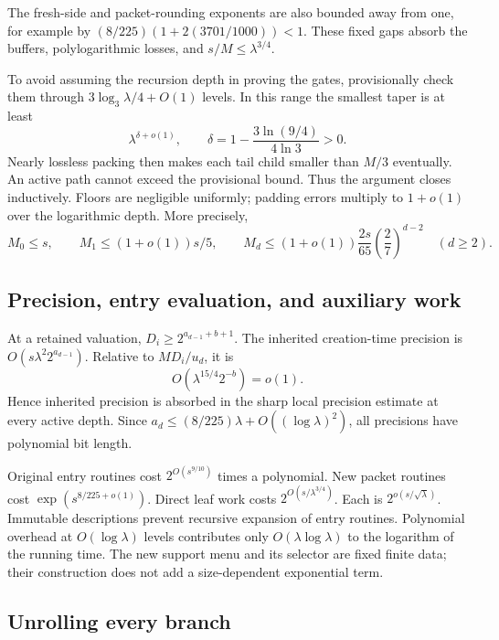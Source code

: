 The fresh-side and packet-rounding exponents are also bounded away from
one, for example by \((8/225)(1+2(3701/1000))<1\).
These fixed gaps absorb the buffers, polylogarithmic losses, and
\(s/M\le\lambda^{3/4}\).

To avoid assuming the recursion depth in proving the gates, provisionally
check them through \(3\log_3\lambda/4+O(1)\) levels.
In this range the smallest taper is at least
\[
 \lambda^{\delta+o(1)},\qquad
 \delta=1-\frac{3\ln(9/4)}{4\ln3}>0.
\]
Nearly lossless packing then makes each tail child smaller than \(M/3\)
eventually. An active path cannot exceed the provisional bound.
Thus the argument closes inductively. Floors are negligible uniformly;
padding errors multiply to \(1+o(1)\) over the logarithmic depth.
More precisely,
\begin{equation}\label{eq:masses}
 M_0\le s,\qquad
 M_1\le(1+o(1))s/5,\qquad
 M_d\le(1+o(1))\frac{2s}{65}
             \left(\frac27\right)^{d-2}\quad(d\ge2).
\end{equation}

\subsection{Precision, entry evaluation, and auxiliary work}

At a retained valuation, \(D_i\ge2^{a_{d-1}+b+1}\). The inherited
creation-time precision is \(O(s\lambda^2 2^{a_{d-1}})\).
Relative to \(MD_i/u_d\), it is
\[
 O(\lambda^{15/4}2^{-b})=o(1).
\]
Hence inherited precision is absorbed in the sharp local precision
estimate at every active depth.
Since \(a_d\le(8/225)\lambda+O((\log\lambda)^2)\), all precisions
have polynomial bit length.

Original entry routines cost \(2^{O(s^{9/10})}\) times a polynomial.
New packet routines cost \(\exp(s^{8/225+o(1)})\).
Direct leaf work costs \(2^{O(s/\lambda^{3/4})}\).
Each is \(2^{o(s/\sqrt\lambda)}\).
Immutable descriptions prevent recursive expansion of entry routines.
Polynomial overhead at \(O(\log\lambda)\) levels contributes only
\(O(\lambda\log\lambda)\) to the logarithm of the running time.
The new support menu and its selector are fixed finite data; their
construction does not add a size-dependent exponential term.

\subsection{Unrolling every branch}

